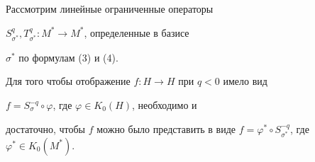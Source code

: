Рассмотрим линейные ограниченные операторы 


$S^q_{\sigma^*},T^q_{\sigma^*}:M^*\to M^*$, определенные в базисе 


$\sigma^*$ по формулам (3) и (4). 


 


\begin{lemnonum} 


Для того чтобы отображение $f:H\to H$ при $q<0$ имело вид 


$f=S^{-q}_\sigma\circ\varphi$, где $\varphi\in K_0(H)$, необходимо и 


достаточно, чтобы $f$ можно было представить в виде $f=\varphi^*\circ 


S^{-q}_{\sigma^*}$, где $\varphi^*\in K_0(M^*)$. 


\end{lemnonum} 


 


